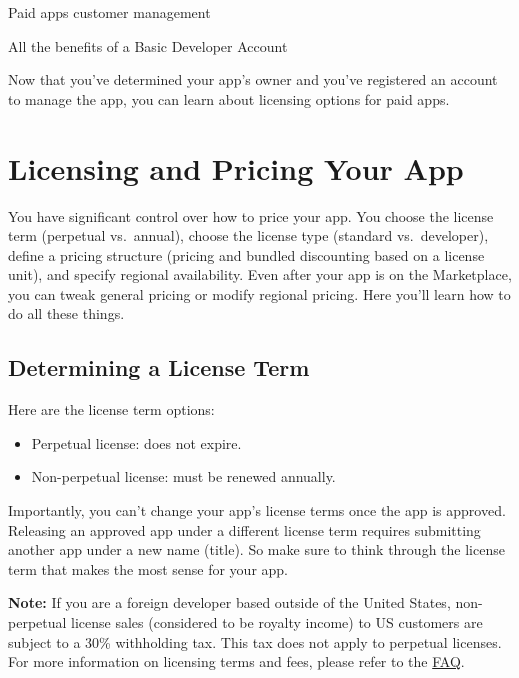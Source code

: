 Paid apps customer management

All the benefits of a Basic Developer Account

Now that you've determined your app's owner and you've registered an
account to manage the app, you can learn about licensing options for
paid apps.

\section{Licensing and Pricing Your
App}\label{licensing-and-pricing-your-app}

You have significant control over how to price your app. You choose the
license term (perpetual vs.~annual), choose the license type (standard
vs.~developer), define a pricing structure (pricing and bundled
discounting based on a license unit), and specify regional availability.
Even after your app is on the Marketplace, you can tweak general pricing
or modify regional pricing. Here you'll learn how to do all these
things.

\subsection{Determining a License
Term}\label{determining-a-license-term}

Here are the license term options:

\begin{itemize}
\item
  Perpetual license: does not expire.
\item
  Non-perpetual license: must be renewed annually.
\end{itemize}

Importantly, you can't change your app's license terms once the app is
approved. Releasing an approved app under a different license term
requires submitting another app under a new name (title). So make sure
to think through the license term that makes the most sense for your
app.

\noindent\hrulefill

\textbf{Note:} If you are a foreign developer based outside of the
United States, non-perpetual license sales (considered to be royalty
income) to US customers are subject to a 30\% withholding tax. This tax
does not apply to perpetual licenses. For more information on licensing
terms and fees, please refer to the \href{/faq}{FAQ}.

\noindent\hrulefill

